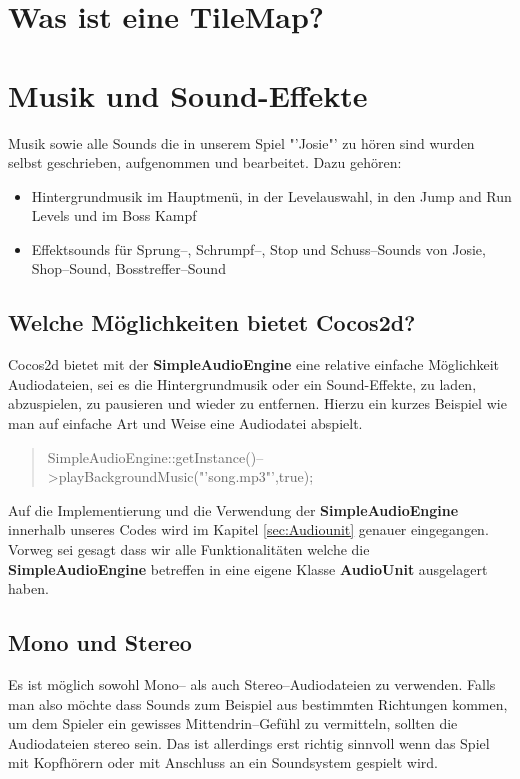\section{Was ist eine TileMap?}

\section{Musik und Sound-Effekte}

Musik sowie alle Sounds die in unserem Spiel "'Josie"' zu hören sind wurden selbst geschrieben, aufgenommen und bearbeitet. Dazu gehören:

\begin{itemize}
\item Hintergrundmusik im Hauptmenü, in der Levelauswahl, in den Jump and Run Levels und im Boss Kampf
\item Effektsounds für Sprung--, Schrumpf--, Stop und Schuss--Sounds von Josie, Shop--Sound, Bosstreffer--Sound
\end{itemize}

\subsection{Welche Möglichkeiten bietet Cocos2d?}
Cocos2d bietet mit der \textbf{SimpleAudioEngine} eine relative einfache Möglichkeit Audio\-dateien, sei es die Hintergrundmusik oder ein Sound-Effekte, zu laden, abzuspielen, zu pausieren und wieder zu entfernen. Hierzu ein kurzes Beispiel wie man auf einfache Art und Weise eine Audiodatei abspielt.

\begin{quote}
SimpleAudioEngine::getInstance()--\textgreater playBackgroundMusic("'song.mp3"',true);
\end{quote}

Auf die Implementierung und die Verwendung der \textbf{SimpleAudioEngine} innerhalb unseres Codes wird im Kapitel \ref{sec:Audiounit} genauer eingegangen. Vorweg sei gesagt dass wir alle Funktionalitäten welche die \textbf{SimpleAudioEngine} betreffen in eine eigene Klasse \textbf{Audio\-Unit} ausgelagert haben.

\subsection{Mono und Stereo}
Es ist möglich sowohl Mono-- als auch Stereo--Audiodateien zu verwenden. Falls man also möchte dass Sounds zum Beispiel aus bestimmten Richtungen kommen, um dem Spieler ein gewisses Mittendrin--Gefühl zu vermitteln, sollten die Audiodateien stereo sein. Das ist allerdings erst richtig sinnvoll wenn das Spiel mit Kopfhörern oder mit Anschluss an ein Soundsystem gespielt wird. 

